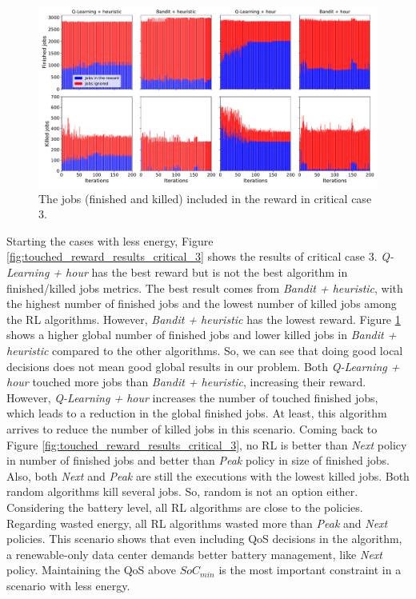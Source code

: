 \begin{figure}[!htb]
    \centering
    \includegraphics[scale=0.33]{Images/Learning_compensations/ignored_jobs_touched_scenario_3.pdf}
    \caption{The jobs (finished and killed) included in the reward in critical case 3.}
    \label{fig:reward_from_jobs_critical_3}
\end{figure}

Starting the cases with less energy, Figure \ref{fig:touched_reward_results_critical_3} shows the results of critical case 3. \emph{Q-Learning + hour} has the best reward but is not the best algorithm in finished/killed jobs metrics. The best result comes from \emph{Bandit + heuristic}, with the highest number of finished jobs and the lowest number of killed jobs among the RL algorithms. However, \emph{Bandit + heuristic} has the lowest reward. Figure \ref{fig:reward_from_jobs_critical_3} shows a higher global number of finished jobs and lower killed jobs in \emph{Bandit + heuristic} compared to the other algorithms. So, we can see that doing good local decisions does not mean good global results in our problem. Both \emph{Q-Learning + hour} touched more jobs than \emph{Bandit + heuristic}, increasing their reward. However, \emph{Q-Learning + hour} increases the number of touched finished jobs, which leads to a reduction in the global finished jobs. At least, this algorithm arrives to reduce the number of killed jobs in this scenario. Coming back to Figure \ref{fig:touched_reward_results_critical_3}, no RL is better than \emph{Next} policy in number of finished jobs and better than \emph{Peak} policy in size of finished jobs. Also, both \emph{Next} and \emph{Peak} are still the executions with the lowest killed jobs. Both random algorithms kill several jobs. So, random is not an option either. Considering the battery level, all RL algorithms are close to the policies. Regarding wasted energy, all RL algorithms wasted more than \emph{Peak} and \emph{Next} policies. This scenario shows that even including QoS decisions in the algorithm, a renewable-only data center demands better battery management, like \emph{Next} policy. Maintaining the QoS above $SoC_{min}$ is the most important constraint in a scenario with less energy.

